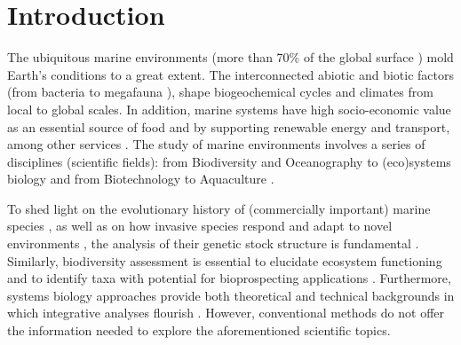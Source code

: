   \section{Introduction}

   The ubiquitous marine environments (more than 70\% of the global surface \citep{noaa}) 
   mold Earth's conditions to a great extent. 
   The interconnected abiotic \citep{falkowski2008microbial} and biotic factors 
   (from bacteria \citep{falkowski2008microbial} to megafauna \citep{estes2016megafaunal}), 
   shape biogeochemical cycles \citep{arrigo2005marine} and climates \citep{boero2007conceptual, beal2011role} 
   from local to global scales. 
   In addition, marine systems have high socio-economic value \citep{remoundou2009valuation} 
   as an essential source of food and by supporting renewable energy and transport, 
   among other services \citep{portner2019ocean}. 
   The study of marine environments involves a series of disciplines (scientific fields): 
   from Biodiversity \citep{sala2006global} and Oceanography to (eco)systems biology \citep{tonon2015marine} 
   and from Biotechnology \citep{dionisi2012bioprospection} to Aquaculture \citep{tidwell2001fish}.

   To shed light on the evolutionary history of (commercially important) 
   marine species \citep{carvalho1995molecular}, as well as on how invasive species respond and 
   adapt to novel environments \citep{sakai2001population}, 
   the analysis of their genetic stock structure is fundamental \citep{begg1999holistic}. 
   Similarly, biodiversity assessment is essential to elucidate ecosystem functioning \citep{loreau2000biodiversity} 
   and to identify taxa with potential for bioprospecting applications \citep{leal2012trends}. 
   Furthermore, systems biology approaches provide both theoretical and technical backgrounds 
   in which integrative analyses flourish \citep{norberg2001phenotypic}. 
   However, conventional methods do not offer the information needed to explore the 
   aforementioned scientific topics.
   
